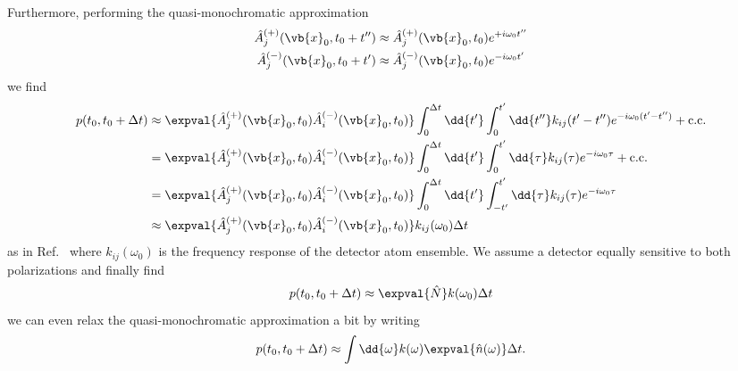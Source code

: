 Furthermore, performing the quasi-monochromatic approximation
\begin{align}
	\hat{A}_j^{(+)}(\vb{x}_0,t_0+t^{\prime\prime})
	&\approx
	\hat{A}_j^{(+)}(\vb{x}_0,t_0)
	e^{+i\omega_0t^{\prime\prime}}
	\\
	\hat{A}_j^{(-)}(\vb{x}_0,t_0+t^{\prime})
	&\approx
	\hat{A}_j^{(-)}(\vb{x}_0,t_0)
	e^{-i\omega_0t^{\prime}}
\end{align}
we find
\begin{equation}
	\begin{split}
		p(t_0,t_0+\Delta t)
		&\approx
		\expval{
			\hat{A}_j^{(+)}(\vb{x}_0,t_0)
			\hat{A}_i^{(-)}(\vb{x}_0,t_0)
		}
		\int_0^{\Delta t}\dd{t^\prime}
		\int_0^{t^\prime}\dd{t^{\prime\prime}}
		k_{ij}(t^{\prime}-t^{\prime\prime})
		e^{-i\omega_0(t^\prime-t^{\prime\prime})}
		+
		\text{c.c.}
		\\
		&=
		\expval{
			\hat{A}_j^{(+)}(\vb{x}_0,t_0)
			\hat{A}_i^{(-)}(\vb{x}_0,t_0)
		}
		\int_0^{\Delta t}\dd{t^\prime}
		\int_0^{t^\prime}\dd{\tau}
		k_{ij}(\tau)
		e^{-i\omega_0\tau}
		+
		\text{c.c.}
		\\
		&=
		\expval{
			\hat{A}_j^{(+)}(\vb{x}_0,t_0)
			\hat{A}_i^{(-)}(\vb{x}_0,t_0)
		}
		\int_0^{\Delta t}\dd{t^\prime}
		\int_{-t^\prime}^{t^\prime}\dd{\tau}
		k_{ij}(\tau)
		e^{-i\omega_0\tau}
		\\
		&\approx
		\expval{
			\hat{A}_j^{(+)}(\vb{x}_0,t_0)
			\hat{A}_i^{(-)}(\vb{x}_0,t_0)
		}
		k_{ij}(\omega_0)
		\Delta t
	\end{split}
\end{equation}
as in Ref.~\cite[p.~699]{Mandel1995} where $k_{ij}(\omega_0)$ is the frequency response of the detector atom ensemble.
We assume a detector equally sensitive to both polarizations and finally find
\begin{equation}
	p(t_0,t_0+\Delta t)
	\approx
	\expval{\hat{N}}
	k(\omega_0)
	\Delta t
\end{equation}
we can even relax the quasi-monochromatic approximation a bit by writing
\begin{equation}
	p(t_0,t_0+\Delta t)
	\approx
	\int\dd{\omega}
	k(\omega)
	\expval{\hat{n}(\omega)}
	\Delta t
	.
\end{equation}